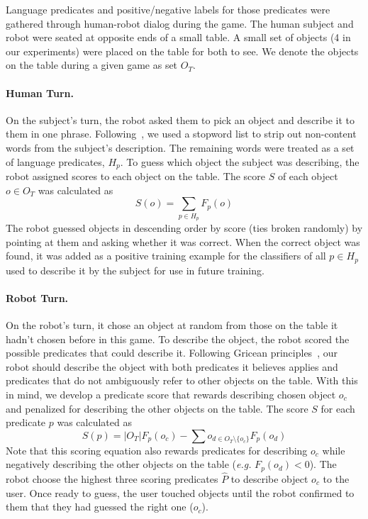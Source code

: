 Language predicates and positive/negative labels for those predicates were gathered through human-robot dialog during the \ispy game.
The human subject and robot were seated at opposite ends of a small table.
A small set of objects (4 in our experiments) were placed on the table for both to see.
We denote the objects on the table during a given game as set $O_T$.

\paragraph{Human Turn.} On the subject's turn, the robot asked them to pick an object and describe it to them in one phrase.
Following~\cite{parde:ijcai15}, we used a stopword list to strip out non-content words from the subject's description.
The remaining words were treated as a set of language predicates, $H_p$.
To guess which object the subject was describing, the robot assigned scores to each object on the table.
The score $S$ of each object $o\in O_T$ was calculated as
\begin{equation}
	S(o) = \sum_{p\in H_p}{F_p(o)}
\end{equation}
The robot guessed objects in descending order by score (ties broken randomly) by pointing at them and asking whether it was correct.
When the correct object was found, it was added as a positive training example for the classifiers of all $p\in H_p$ used to describe it by the subject for use in future training.

\paragraph{Robot Turn.} On the robot's turn, it chose an object at random from those on the table it hadn't chosen before in this game.
To describe the object, the robot scored the possible predicates that could describe it.
Following Gricean principles~\cite{grice:bkchapter75}, our robot should describe the object with both predicates it believes applies and predicates that do not ambiguously refer to other objects on the table.
With this in mind, we develop a predicate score that rewards describing chosen object $o_c$ and penalized for describing the other objects on the table.
The score $S$ for each predicate $p$ was calculated as
\begin{equation}
	S(p) = |O_T|F_p(o_c) - \sum{o_{d\in{O_T}\setminus\{o_c\}}}{F_p(o_d)}
\end{equation}
Note that this scoring equation also rewards predicates for describing $o_c$ while negatively describing the other objects on the table (\textit{e.g.} $F_p(o_d)<0$).
The robot choose the highest three scoring predicates $\hat{P}$ to describe object $o_c$ to the user.
Once ready to guess, the user touched objects until the robot confirmed to them that they had guessed the right one ($o_c$).

